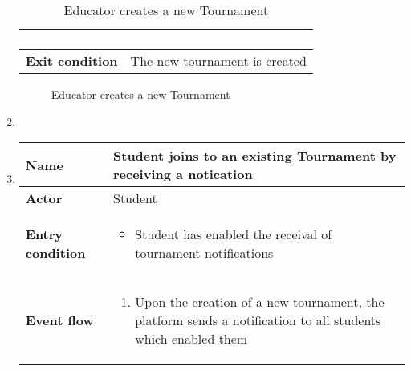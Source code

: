 \begin{enumerate}[label=\textbf{UC\arabic*}:,leftmargin=1.3cm]
\begin{table}[H]
\begin{tabular}{|l|p{11.9cm}|}
\begin{enumerate}[label=\arabic*.]
              \end{enumerate} \\\hline
              \textbf{Exit condition}  & The new tournament is created                                                        \\\hline
          \end{tabular}
          \caption{Educator creates a new Tournament }
          \label{table:Educator creates a new Tournament }
      \end{table}
  
      \begin{figure}[H]
          \centering
          \caption{Educator creates a new Tournament }
          \label{fig:Educator creates a new Tournament }
      \end{figure}
      \pagebreak
      \item \textbf{}
            \pagebreak
      \item \textbf{}
            \begin{table}[H]
                  \centering
                  \begin{tabular}{|l|p{11.9cm}|}
                        \hline
                        \textbf{Name}            & Student joins to an existing Tournament by receiving a notication                     \\\hline
                        \textbf{Actor}           & Student                                                                               \\\hline
                        \textbf{Entry condition} &
                        \begin{itemize}
                              \item Student has enabled the receival of tournament notifications
                        \end{itemize}                                                \\\hline
                        \textbf{Event flow}      &
                        \begin{enumerate}[label=\arabic*.]
                              \item Upon the creation of a new tournament, the platform sends a notification to all students which enabled them

\end{enumerate}
\end{tabular}
\end{table}
\end{enumerate}
